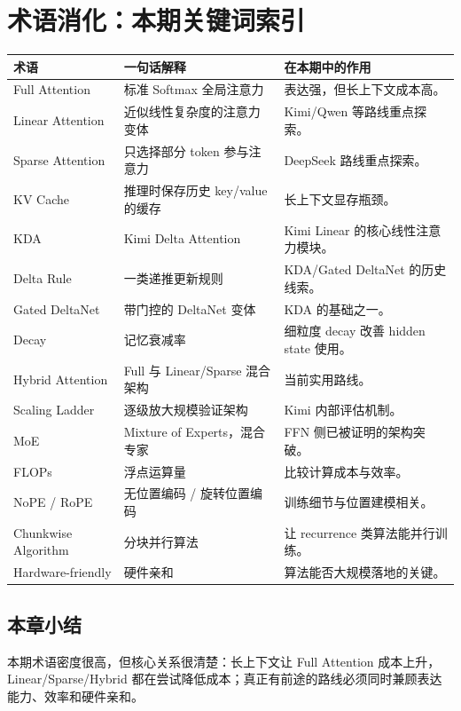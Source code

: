 \section{术语消化：本期关键词索引}

\begin{longtable}{p{}p{}p{}}
\toprule
术语 & 一句话解释 & 在本期中的作用 \\
\midrule
Full Attention & 标准 Softmax 全局注意力 & 表达强，但长上下文成本高。 \\
Linear Attention & 近似线性复杂度的注意力变体 & Kimi/Qwen 等路线重点探索。 \\
Sparse Attention & 只选择部分 token 参与注意力 & DeepSeek 路线重点探索。 \\
KV Cache & 推理时保存历史 key/value 的缓存 & 长上下文显存瓶颈。 \\
KDA & Kimi Delta Attention & Kimi Linear 的核心线性注意力模块。 \\
Delta Rule & 一类递推更新规则 & KDA/Gated DeltaNet 的历史线索。 \\
Gated DeltaNet & 带门控的 DeltaNet 变体 & KDA 的基础之一。 \\
Decay & 记忆衰减率 & 细粒度 decay 改善 hidden state 使用。 \\
Hybrid Attention & Full 与 Linear/Sparse 混合架构 & 当前实用路线。 \\
Scaling Ladder & 逐级放大规模验证架构 & Kimi 内部评估机制。 \\
MoE & Mixture of Experts，混合专家 & FFN 侧已被证明的架构突破。 \\
FLOPs & 浮点运算量 & 比较计算成本与效率。 \\
NoPE / RoPE & 无位置编码 / 旋转位置编码 & 训练细节与位置建模相关。 \\
Chunkwise Algorithm & 分块并行算法 & 让 recurrence 类算法能并行训练。 \\
Hardware-friendly & 硬件亲和 & 算法能否大规模落地的关键。 \\
\bottomrule
\end{longtable}

\subsection{本章小结}

本期术语密度很高，但核心关系很清楚：长上下文让 Full Attention 成本上升，Linear/Sparse/Hybrid 都在尝试降低成本；真正有前途的路线必须同时兼顾表达能力、效率和硬件亲和。


